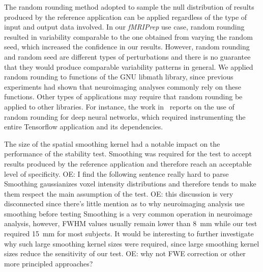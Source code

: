 \documentclass[lettersize,journal]{IEEEtran}
\newcommand{\oesteban}[1]{\color{orange}\textsc{OE:} #1\color{black}\xspace}
\newcommand{\fmriprep}{\emph{fMRIPrep}\xspace}
\begin{document}
The random rounding method adopted to sample the null distribution of results produced by the reference application can be applied regardless of the type of input and output data involved. In our \fmriprep use case, random rounding resulted in variability comparable to the one obtained from varying the random seed, which increased the confidence in our results. However, random rounding and random seed are different types of perturbations and there is no guarantee that they would produce comparable variability patterns in general. We applied random rounding to functions of the GNU libmath library, since previous experiments had shown that neuroimaging analyses commonly rely on these functions. Other types of applications may require that random rounding be applied to other libraries. For instance, the work in~\cite{pepe2022numerical} reports on the use of random rounding for deep neural networks, which required instrumenting the entire Tensorflow application and its dependencies.

The size of the spatial smoothing kernel had a notable impact on the performance of the stability test. Smoothing was required for the test to accept results produced by the reference application and therefore reach an acceptable level of specificity.
\oesteban{I find the following sentence really hard to parse}
Smoothing gaussianizes voxel intensity distributions and therefore tends to make them respect the main assumption of the test. 
\oesteban{this discussion is very disconnected since there's little mention as to why neuroimaging analysis use smoothing before testing}
Smoothing is a very common operation in neuroimage analysis, however, FWHM values usually remain lower than 8~mm while our test required 15~mm for most subjects. It would be interesting to further investigate why such large smoothing kernel sizes were required, since large smoothing kernel sizes reduce the sensitivity of our test.
\oesteban{why not FWE correction or other more principled approaches?}
\end{document}
